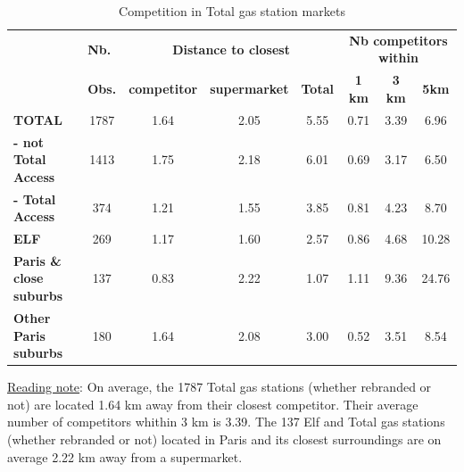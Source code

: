 \documentclass[english]{article}
\begin{document}
\begin{table}
\caption{Competition in Total gas station markets}
\label{tab:competitiveness_total_markets_stats}
\begin{threeparttable}
\begin{tabular}{lccccccc}
\hline
\hline
& \multicolumn{1}{l}{\textbf{Nb.}} & \multicolumn{3}{c}{\textbf{Distance to closest}} & \multicolumn{3}{c}{\textbf{Nb competitors within}}  \tabularnewline \cmidrule(l{2pt}r{2pt}){3-5} \cmidrule(l{2pt}r{2pt}){6-8}
& \multicolumn{1}{l}{\textbf{Obs.}} & \textbf{competitor}{ } & \textbf{supermarket}{ } & \textbf{Total}{ } & \textbf{1 km}{ } & \textbf{3 km}{ } & \textbf{ 5km }\tabularnewline
\hline
\textbf{TOTAL}{ } & {1787 } & {1.64 } & {2.05 } & {5.55 } & {0.71 } & {3.39 } & {6.96 }\tabularnewline
\textbf{- not Total Access}{ } & {1413 } & {1.75 } & {2.18 } & {6.01 } & {0.69 } & {3.17 } & {6.50 }\tabularnewline
\textbf{- Total Access}{ } & {374 } & {1.21 } & {1.55 } & {3.85 } & {0.81 } & {4.23 } & {8.70 }\tabularnewline
\hline
\textbf{ELF}{ } & {269 } & {1.17 } & {1.60 } & {2.57 } & {0.86 } & {4.68 } & {10.28 }\tabularnewline
\hline
\textbf{Paris \& close suburbs}{ } & {137 } & {0.83 } & {2.22 } & {1.07 } & {1.11 } & {9.36 } & {24.76}\tabularnewline
\textbf{Other Paris suburbs}{ } & {180 } & {1.64 } & {2.08 } & {3.00 } & {0.52 } & {3.51 } & {8.54}\tabularnewline
\hline
\hline
\end{tabular}
\end{threeparttable}
\parbox{\textwidth}{\small%
\vspace{2eX} %
{\small{}\uline{Reading note}}{\small{}: }On average, the 1787 Total gas stations (whether rebranded or not) are located 1.64 km away from their closest competitor. Their average number of competitors whithin 3 km is 3.39. The 137 Elf and Total gas stations (whether rebranded or not) located in Paris and its closest surroundings are on average 2.22 km away from a supermarket.}
\end{table}
\end{document}

